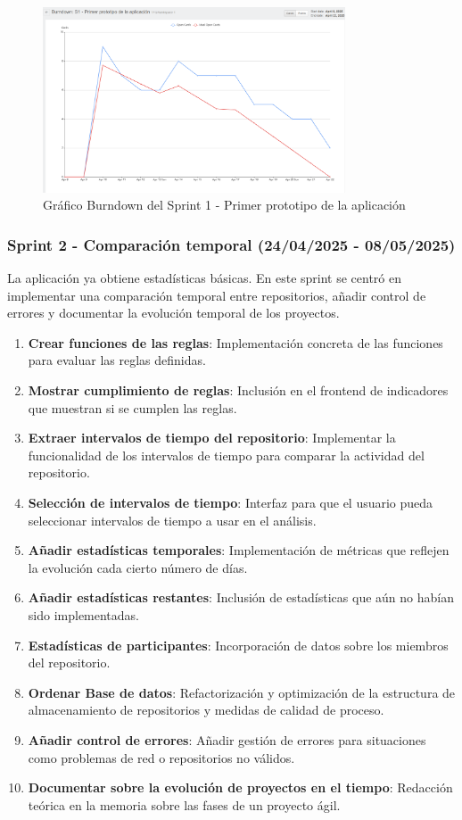 \begin{figure}[H]
\centering
\includegraphics[width=0.8\textwidth]{img/BurndownS1.png}
\caption{Gráfico Burndown del Sprint 1 - Primer prototipo de la aplicación}
\label{fig:BurndownS1}
\end{figure}

\subsubsection{Sprint 2 - Comparación temporal (24/04/2025 - 08/05/2025)}

La aplicación ya obtiene estadísticas básicas. En este sprint se centró en implementar una comparación temporal entre repositorios, añadir control de errores y documentar la evolución temporal de los proyectos.

\begin{enumerate}
\item \textbf{Crear funciones de las reglas}: Implementación concreta de las funciones para evaluar las reglas definidas.
\item \textbf{Mostrar cumplimiento de reglas}: Inclusión en el frontend de indicadores que muestran si se cumplen las reglas.
\item \textbf{Extraer intervalos de tiempo del repositorio}: Implementar la funcionalidad de los intervalos de tiempo para comparar la actividad del repositorio.
\item \textbf{Selección de intervalos de tiempo}: Interfaz para que el usuario pueda seleccionar intervalos de tiempo a usar en el análisis.
\item \textbf{Añadir estadísticas temporales}: Implementación de métricas que reflejen la evolución cada cierto número de días.
\item \textbf{Añadir estadísticas restantes}: Inclusión de estadísticas que aún no habían sido implementadas.
\item \textbf{Estadísticas de participantes}: Incorporación de datos sobre los miembros del repositorio.
\item \textbf{Ordenar Base de datos}: Refactorización y optimización de la estructura de almacenamiento de repositorios y medidas de calidad de proceso.
\item \textbf{Añadir control de errores}: Añadir gestión de errores para situaciones como problemas de red o repositorios no válidos.
\item \textbf{Documentar sobre la evolución de proyectos en el tiempo}: Redacción teórica en la memoria sobre las fases de un proyecto ágil.
\end{enumerate}

